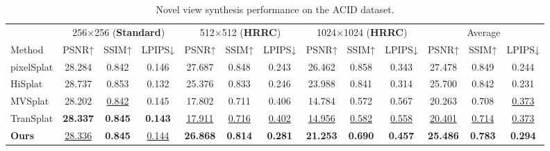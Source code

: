 \begin{table}[ht]
\centering
\caption{Novel view synthesis performance on the ACID dataset.}
\label{acid}
\fontsize{7}{11.5}\selectfont
\setlength{\tabcolsep}{4pt}
\begin{tabular}{lccc|ccc|ccc|ccc}
\toprule
& \multicolumn{3}{c|}{256$\times$256 (\textbf{Standard})} & \multicolumn{3}{c|}{512$\times$512 (\textbf{HRRC})} & \multicolumn{3}{c|}{1024$\times$1024 (\textbf{HRRC})} & \multicolumn{3}{c}{Average} \\
Method & PSNR↑ & SSIM↑ & LPIPS↓ & PSNR↑ & SSIM↑ & LPIPS↓ & PSNR↑ & SSIM↑ & LPIPS↓ & PSNR↑ & SSIM↑ & LPIPS↓ \\
\midrule
pixelSplat  & 28.284 & 0.842 & 0.146 & 27.687 & 0.848 & 0.243 & 26.462 & 0.858 & 0.343 & 27.478 & 0.849 & 0.244 \\
HiSplat  & 28.737 & 0.853 & 0.132 & 25.376 & 0.833 & 0.246 & 23.988 & 0.841 & 0.314 & 25.700 & 0.842 & 0.231 \\
\midrule
MVSplat & 28.202 & \underline{0.842} & 0.145 & 17.802 & 0.711 & 0.406 & 14.784 & 0.572 & 0.567 & 20.263 & 0.708 & \underline{0.373} \\
TranSplat  & \textbf{28.337} & \textbf{0.845} & \textbf{0.143} & \underline{17.911} & \underline{0.716} & \underline{0.402} & \underline{14.956} & \underline{0.582} & \underline{0.558} & \underline{20.401} & \underline{0.714} & \underline{0.373} \\
\textbf{Ours} & \underline{28.336} & \textbf{0.845} & \underline{0.144} & \textbf{26.868} & \textbf{0.814} & \textbf{0.281} & \textbf{21.253} & \textbf{0.690} & \textbf{0.457} & \textbf{25.486} & \textbf{0.783} & \textbf{0.294} \\
\bottomrule
\end{tabular}
\vspace{-12pt}
\end{table}

